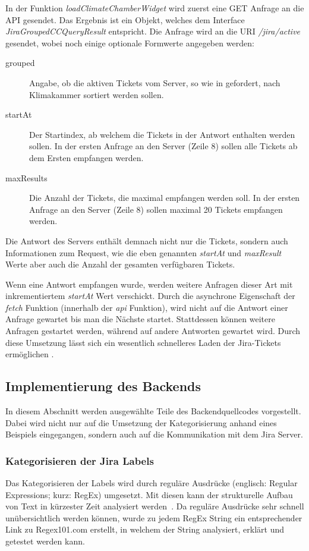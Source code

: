 In der Funktion \textit{loadClimateChamberWidget} wird zuerst eine GET Anfrage an die \gls{API} gesendet.
Das Ergebnis ist ein Objekt, welches dem Interface \textit{JiraGroupedCCQueryResult} entspricht.
Die Anfrage wird an die \gls{URI} \textit{/jira/active} gesendet, wobei noch einige optionale 
Formwerte angegeben werden:

\begin{description}
    \item[grouped]
    Angabe, ob die aktiven Tickets vom Server, so wie in 
    gefordert, nach Klimakammer sortiert werden sollen.

    \item[startAt]
    Der Startindex, ab welchem die Tickets in der Antwort enthalten werden sollen. In der ersten 
    Anfrage an den Server (Zeile 8) sollen alle Tickets ab dem Ersten empfangen werden.

    \item[maxResults]
    Die Anzahl der Tickets, die maximal empfangen werden soll. In der ersten 
    Anfrage an den Server (Zeile 8) sollen maximal 20 Tickets empfangen werden.
\end{description}

Die Antwort des Servers enthält demnach nicht nur die Tickets, sondern auch Informationen
zum Request, wie die eben genannten \textit{startAt} und \textit{maxResult} Werte
aber auch die Anzahl der gesamten verfügbaren Tickets.

Wenn eine Antwort empfangen wurde, werden weitere Anfragen dieser Art mit inkrementiertem \textit{startAt} Wert verschickt.
Durch die asynchrone Eigenschaft der \textit{fetch} Funktion (innerhalb der \textit{api} Funktion),
wird nicht auf die Antwort einer Anfrage gewartet bis man die Nächste startet.
Stattdessen können weitere Anfragen gestartet werden, während auf andere Antworten gewartet wird.
Durch diese Umsetzung lässt sich ein wesentlich schnelleres Laden der Jira-Tickets ermöglichen .

\subsection{Implementierung des Backends}
In diesem Abschnitt werden ausgewählte Teile des Backendquellcodes vorgestellt.
Dabei wird nicht nur auf die Umsetzung der Kategorisierung anhand eines Beispiels eingegangen,
sondern auch auf die Kommunikation mit dem \gls{Jira} Server.

\subsubsection{Kategorisieren der Jira Labels}
Das Kategorisieren der Labels wird durch reguläre Ausdrücke (englisch: Regular 
Expressions; kurz: RegEx) umgesetzt. Mit diesen kann der strukturelle Aufbau 
von Text in kürzester Zeit analysiert werden~\cite{fitzgerald2012einstieg}. Da reguläre
Ausdrücke sehr schnell unübersichtlich werden können, wurde zu jedem 
RegEx String ein entsprechender Link zu Regex101.com erstellt, in welchem der String
analysiert, erklärt und getestet werden kann.\\


